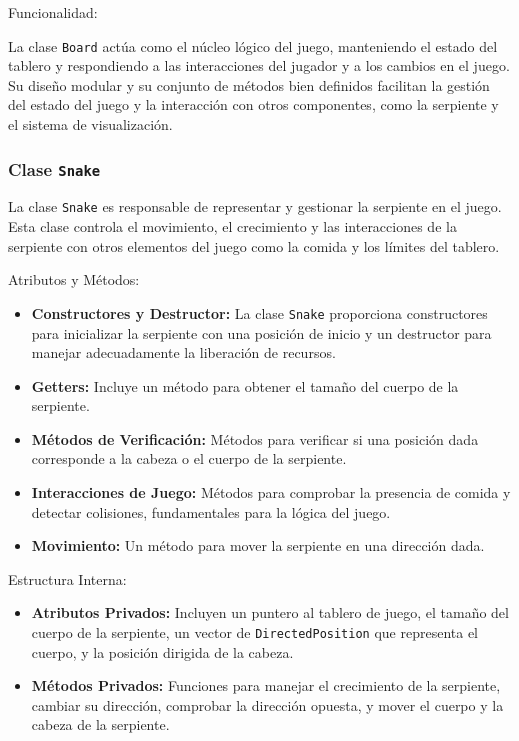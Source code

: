 Funcionalidad:

La clase \texttt{Board} actúa como el núcleo lógico del juego, manteniendo el estado del tablero y respondiendo a las interacciones del jugador y a los cambios en el juego. Su diseño modular y su conjunto de métodos bien definidos facilitan la gestión del estado del juego y la interacción con otros componentes, como la serpiente y el sistema de visualización.


\subsubsection{Clase \texttt{Snake}}

La clase \texttt{Snake} es responsable de representar y gestionar la serpiente en el juego. Esta clase controla el movimiento, el crecimiento y las interacciones de la serpiente con otros elementos del juego como la comida y los límites del tablero.

Atributos y Métodos:

\begin{itemize}
    \item \textbf{Constructores y Destructor:} La clase \texttt{Snake} proporciona constructores para inicializar la serpiente con una posición de inicio y un destructor para manejar adecuadamente la liberación de recursos.
    \item \textbf{Getters:} Incluye un método para obtener el tamaño del cuerpo de la serpiente.
    \item \textbf{Métodos de Verificación:} Métodos para verificar si una posición dada corresponde a la cabeza o el cuerpo de la serpiente.
    \item \textbf{Interacciones de Juego:} Métodos para comprobar la presencia de comida y detectar colisiones, fundamentales para la lógica del juego.
    \item \textbf{Movimiento:} Un método para mover la serpiente en una dirección dada.
\end{itemize}

Estructura Interna:

\begin{itemize}
    \item \textbf{Atributos Privados:} Incluyen un puntero al tablero de juego, el tamaño del cuerpo de la serpiente, un vector de \texttt{DirectedPosition} que representa el cuerpo, y la posición dirigida de la cabeza.
    \item \textbf{Métodos Privados:} Funciones para manejar el crecimiento de la serpiente, cambiar su dirección, comprobar la dirección opuesta, y mover el cuerpo y la cabeza de la serpiente.
\end{itemize}

